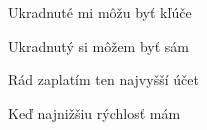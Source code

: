 \begin{song}
\bigskip

\Refren

\bigskip

Ukradnuté mi môžu byť kľúče \par
{}Ukradnutý si môžem byť sám \par
{}Rád zaplatím ten najvyšší účet \par
Keď najnižšiu rýchlosť mám \par

\bigskip

\Refren

\bigskip


\end{song}